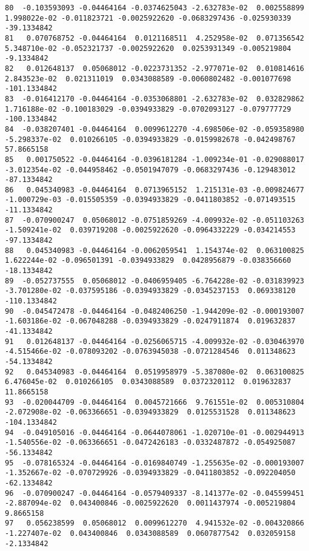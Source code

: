 \documentclass[15pt,a4paper,openright]{article}
\begin{document}
\begin{lstlisting}[language=AMPL, caption = data file]
80  -0.103593093 -0.04464164 -0.0374625043 -2.632783e-02  0.002558899  1.998022e-02 -0.011823721 -0.0025922620 -0.0683297436 -0.025930339  -39.1334842
81   0.070768752 -0.04464164  0.0121168511  4.252958e-02  0.071356542  5.348710e-02 -0.052321737 -0.0025922620  0.0253931349 -0.005219804   -9.1334842
82   0.012648137  0.05068012 -0.0223731352 -2.977071e-02  0.010814616  2.843523e-02  0.021311019  0.0343088589 -0.0060802482 -0.001077698 -101.1334842
83  -0.016412170 -0.04464164 -0.0353068801 -2.632783e-02  0.032829862  1.716188e-02 -0.100183029 -0.0394933829 -0.0702093127 -0.079777729 -100.1334842
84  -0.038207401 -0.04464164  0.0099612270 -4.698506e-02 -0.059358980 -5.298337e-02  0.010266105 -0.0394933829 -0.0159982678 -0.042498767   57.8665158
85   0.001750522 -0.04464164 -0.0396181284 -1.009234e-01 -0.029088017 -3.012354e-02 -0.044958462 -0.0501947079 -0.0683297436 -0.129483012  -87.1334842
86   0.045340983 -0.04464164  0.0713965152  1.215131e-03 -0.009824677 -1.000729e-03 -0.015505359 -0.0394933829 -0.0411803852 -0.071493515  -11.1334842
87  -0.070900247  0.05068012 -0.0751859269 -4.009932e-02 -0.051103263 -1.509241e-02  0.039719208 -0.0025922620 -0.0964332229 -0.034214553  -97.1334842
88   0.045340983 -0.04464164 -0.0062059541  1.154374e-02  0.063100825  1.622244e-02 -0.096501391 -0.0394933829  0.0428956879 -0.038356660  -18.1334842
89  -0.052737555  0.05068012 -0.0406959405 -6.764228e-02 -0.031839923 -3.701280e-02 -0.037595186 -0.0394933829 -0.0345237153  0.069338120 -110.1334842
90  -0.045472478 -0.04464164 -0.0482406250 -1.944209e-02 -0.000193007 -1.603186e-02 -0.067048288 -0.0394933829 -0.0247911874  0.019632837  -41.1334842
91   0.012648137 -0.04464164 -0.0256065715 -4.009932e-02 -0.030463970 -4.515466e-02 -0.078093202 -0.0763945038 -0.0721284546  0.011348623  -54.1334842
92   0.045340983 -0.04464164  0.0519958979 -5.387080e-02  0.063100825  6.476045e-02  0.010266105  0.0343088589  0.0372320112  0.019632837   11.8665158
93  -0.020044709 -0.04464164  0.0045721666  9.761551e-02  0.005310804 -2.072908e-02 -0.063366651 -0.0394933829  0.0125531528  0.011348623 -104.1334842
94  -0.049105016 -0.04464164 -0.0644078061 -1.020710e-01 -0.002944913 -1.540556e-02 -0.063366651 -0.0472426183 -0.0332487872 -0.054925087  -56.1334842
95  -0.078165324 -0.04464164 -0.0169840749 -1.255635e-02 -0.000193007 -1.352667e-02 -0.070729926 -0.0394933829 -0.0411803852 -0.092204050  -62.1334842
96  -0.070900247 -0.04464164 -0.0579409337 -8.141377e-02 -0.045599451 -2.887094e-02  0.043400846 -0.0025922620  0.0011437974 -0.005219804    9.8665158
97   0.056238599  0.05068012  0.0099612270  4.941532e-02 -0.004320866 -1.227407e-02  0.043400846  0.0343088589  0.0607877542  0.032059158   -2.1334842

\end{lstlisting}
\end{document}
